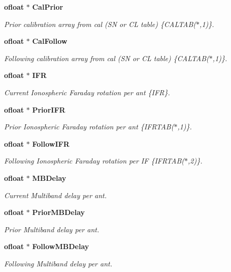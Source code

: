 \begin{CompactItemize}
{\bf ofloat} $\ast$ {\bf Cal\-Prior}
\begin{CompactList}\small\item\em Prior calibration array from cal (SN or CL table) \{CALTAB($\ast$,1)\}. \item\end{CompactList}\item 
{\bf ofloat} $\ast$ {\bf Cal\-Follow}
\begin{CompactList}\small\item\em Following calibration array from cal (SN or CL table) \{CALTAB($\ast$,1)\}. \item\end{CompactList}\item 
{\bf ofloat} $\ast$ {\bf IFR}
\begin{CompactList}\small\item\em Current Ionospheric Faraday rotation per ant \{IFR\}. \item\end{CompactList}\item 
{\bf ofloat} $\ast$ {\bf Prior\-IFR}
\begin{CompactList}\small\item\em Prior Ionospheric Faraday rotation per ant \{IFRTAB($\ast$,1)\}. \item\end{CompactList}\item 
{\bf ofloat} $\ast$ {\bf Follow\-IFR}
\begin{CompactList}\small\item\em Following Ionospheric Faraday rotation per IF \{IFRTAB($\ast$,2)\}. \item\end{CompactList}\item 
{\bf ofloat} $\ast$ {\bf MBDelay}
\begin{CompactList}\small\item\em Current Multiband delay per ant. \item\end{CompactList}\item 
{\bf ofloat} $\ast$ {\bf Prior\-MBDelay}
\begin{CompactList}\small\item\em Prior Multiband delay per ant. \item\end{CompactList}\item 
{\bf ofloat} $\ast$ {\bf Follow\-MBDelay}
\begin{CompactList}\small\item\em Following Multiband delay per ant. \item\end{CompactList}\item 

\end{CompactItemize}
